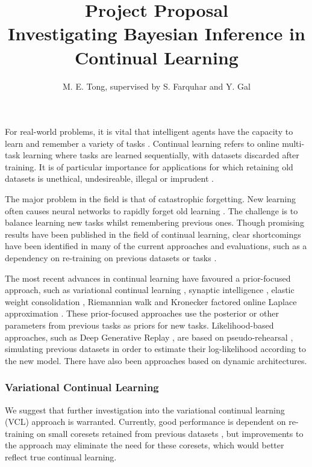 \documentclass[a4paper,11=0pt]{article}
\title{\vspace*{-2em}\textbf{Project Proposal}\\ \vspace{0.25em} \Large Investigating Bayesian Inference in Continual Learning}
\author{M. E. Tong, supervised by S. Farquhar and Y. Gal}
\date{}
\begin{document}
\maketitle


\vspace{-1em}
For real-world problems, it is vital that intelligent agents have the capacity to learn and remember a variety of tasks \cite{ewc}. Continual learning refers to online multi-task learning where tasks are learned sequentially, with datasets discarded after training. It is of particular importance for applications for which retaining old datasets is unethical, undesireable, illegal or imprudent \cite{unifying, robust}.

The major problem in the field is that of catastrophic forgetting. New learning often causes neural networks to rapidly forget old learning \cite{catastrophic}. The challenge is to balance learning new tasks whilst remembering previous ones. Though promising results have been published in the field of continual learning, clear shortcomings have been identified in many of the current approaches and evaluations, such as a dependency on re-training on previous datasets or tasks \cite{robust}. 

The most recent advances in continual learning have favoured a prior-focused approach, such as variational continual learning \cite{vcl}, synaptic intelligence \cite{si}, elastic weight consolidation \cite{ewc}, Riemannian walk \cite{rw} and Kronecker factored online Laplace approximation \cite{ritter}. These prior-focused approaches use the posterior or other parameters from previous tasks as priors for new tasks. Likelihood-based approaches, such as Deep Generative Replay \cite{dgr}, are based on pseudo-rehearsal \cite{robins}, simulating previous datasets in order to estimate their log-likelihood according to the new model. There have also been approaches based on dynamic architectures. %

\vspace{-1em}
\subsubsection*{Variational Continual Learning}

\vspace{-1em}
We suggest that further investigation into the variational continual learning (VCL)  \cite{vcl} approach is warranted. Currently, good performance is dependent on re-training on small coresets retained from previous datasets \cite{robust}, but improvements to the approach may eliminate the need for these coresets, which would better reflect true continual learning.
\end{document}
